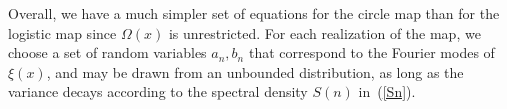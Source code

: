 Overall, we have a much simpler set of equations for the circle map
than for the logistic map since $\Omega(x)$ is unrestricted. For each realization of the map, we choose
a set of random variables $a_n, b_n$ that correspond to the Fourier
modes of $\xi(x)$, and may be drawn from an
unbounded distribution, as long as the variance decays according to
the spectral density $S(n)$ in~(\ref{Sn}). 